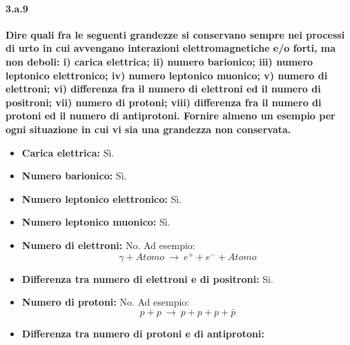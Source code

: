\documentclass[twoside]{article}
\begin{document}
\paragraph{3.a.9}\textbf{Dire quali fra le seguenti grandezze si conservano sempre nei processi di urto in
cui avvengano interazioni elettromagnetiche e/o forti, ma non deboli: i) carica
elettrica; ii) numero barionico; iii) numero leptonico elettronico; iv) numero
leptonico muonico; v) numero di elettroni; vi) differenza fra il numero di elettroni
ed il numero di positroni; vii) numero di protoni; viii) differenza fra il numero di
protoni ed il numero di antiprotoni. Fornire almeno un esempio per ogni
situazione in cui vi sia una grandezza non conservata.}\\
\begin{itemize}
    \item \textbf{Carica elettrica:} Sì.
    \item \textbf{Numero barionico:} Sì.
    \item \textbf{Numero leptonico elettronico:}  Sì.
    \item \textbf{Numero leptonico muonico:} Sì.
    \item \textbf{Numero di elettroni:} No. Ad esempio:
    \begin{equation}
        \gamma + Atomo \ \to \ e^+ + e^- + Atomo
    \end{equation}
    \item \textbf{Differenza tra numero di elettroni e di positroni:} Si.
    \item \textbf{Numero di protoni:} No. Ad esempio:
    \begin{equation}
        p+p \ \rightarrow \ p+p+p+\bar{p}
    \end{equation}
    \item \textbf{Differenza tra numero di protoni e di antiprotoni:}
\end{itemize}
\end{document}
